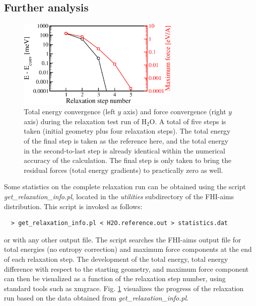 \subsection*{Further analysis}

\begin{figure}
  \centering
  \includegraphics[width=0.7\textwidth]{H2O_trm_lindh_relaxation}
  \caption{\label{Fig:H2O-relaxation}
           Total energy convergence (left $y$ axis) and force convergence
           (right $y$ axis) during the relaxation test run of H$_2$O. A total
           of five steps is taken (initial geometry plus four relaxation
           steps). The total energy of the final step is taken as the
           reference here, and the total energy in the second-to-last step is
           already identical within the numerical accuracy of the
           calculation. The final step is only taken to bring the residual
           forces (total energy gradients) to practically zero as well.
  }
\end{figure}
Some statistics on the complete relaxation run can be obtained
using the script \\ \emph{get\_relaxation\_info.pl}, located in the
\emph{utilities} subdirectory of the FHI-aims distribution. This
script is invoked as follows:

\begin{verbatim}
  > get_relaxation_info.pl < H2O.reference.out > statistics.dat
\end{verbatim}

or with any other output file. The script searches the FHI-aims output
file for total energies (no entropy correction) and maximum force
components at the end of each relaxation step. The development of the
total energy, total energy difference with respect to the starting
geometry, and maximum force component can then be visualized as a
function of the relaxation step number, using standard tools such as
xmgrace. Fig. \ref{Fig:H2O-relaxation} visualizes the progress of the
relaxation run based on the data obtained from
\emph{get\_relaxation\_info.pl}. 

